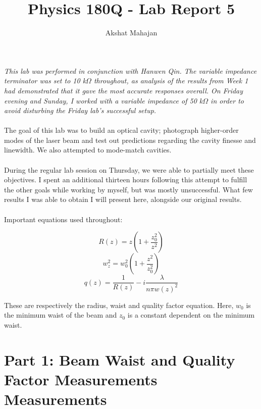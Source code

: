 \documentclass[10pt,a4paper]{article}
\author{Akshat Mahajan}
\title{Physics 180Q - Lab Report 5}
\begin{document}
\maketitle

\noindent \textsl{This lab was performed in conjunction with Hanwen Qin. The variable impedance terminator was set to 10 k$\Omega$ throughout, as analysis of the results from Week 1 had demonstrated that it gave the most accurate responses overall. On Friday evening and Sunday, I worked with a variable impedance of 50 k$\Omega$ in order to avoid disturbing the Friday lab's successful setup.}\\
\\
The goal of this lab was to build an optical cavity; photograph higher-order modes of the laser beam and test out predictions regarding the cavity finesse and linewidth. We also attempted to mode-match cavities.\\
\\
During the regular lab session on Thursday, we were able to partially meet these objectives. I spent an additional thirteen hours following this attempt to fulfill the other goals while working by myself, but was mostly unsuccessful. What few results I was able to obtain I will present here, alongside our original results.\\
\\Important equations used throughout:

$$R(z) = z\left(1 + \dfrac{z_{0}^{2}}{z^{2}}\right)$$
$$w_{z}^{2} = w_{0}^{2}\left(1 + \dfrac{z^{2}}{z_{0}^{2}}\right)$$
$$q(z) = \dfrac{1}{R(z)} - i\dfrac{\lambda}{n\pi w(z)^{2}}$$

These are respectively the radius, waist and quality factor equation. Here, $w_{0}$ is the minimum waist of the beam and $z_{0}$ is a constant dependent on the minimum waist.

\section*{Part 1: Beam Waist and Quality Factor Measurements Measurements}
\end{document}
